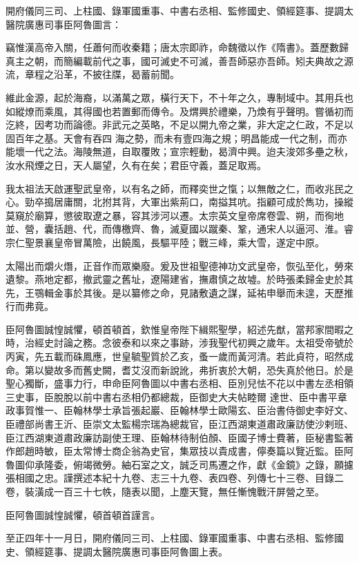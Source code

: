 
\begin{pinyinscope}

 開府儀同三司、上柱國、錄軍國重事、中書右丞相、監修國史、領經筵事、提調太醫院廣惠司事臣阿魯圖言：



 竊惟漢高帝入關，任蕭何而收秦籍；唐太宗即祚，命魏徵以作《隋書》。蓋歷數歸真主之朝，而簡編載前代之事，國可滅史不可滅，善吾師惡亦吾師。矧夫典故之源流，章程之沿革，不披往牒，曷蓄前聞。



 維此金源，起於海裔，以滿萬之眾，橫行天下，不十年之久，專制域中。其用兵也如縱燎而乘風，其得國也若置郵而傳令。及煟興於禮樂，乃煥有乎聲明。嘗循初而汔終，因考功而論德。非武元之英略，不足以開九帝之業，非大定之仁政，不足以固百年之基。天會有吞四
 海之勢，而未有壹四海之規；明昌能成一代之制，而亦能壞一代之法。海陵無道，自取覆敗；宣宗輕動，曷濟中興。迨夫浚郊多壘之秋，汝水飛煙之日，天人屬望，久有在矣；君臣守義，蓋足取焉。



 我太祖法天啟運聖武皇帝，以有名之師，而釋奕世之愾；以無敵之仁，而收兆民之心。勁卒搗居庸關，北拊其背，大軍出紫荊口，南搤其吭。指顧可成於雋功，操縱莫窺於廟算，懲彼取遼之暴，容其涉河以遷。太宗英文皇帝席卷雲、朔，而徇地並、營，囊括趙、代，而傳檄齊、魯，滅夏國以蹴秦、鞏，通宋人以逼河、淮。睿宗仁聖景襄皇帝冒萬險，出饒風，長驅平陸；戰三峰，乘大雪，遂定中原。



 太陽出而爝火熸，正音作而眾樂廢。爰及世祖聖德神功文武皇帝，恢弘至化，勞來遺黎。燕地定都，撤武靈之舊址，遼陽建省，撫肅慎之故墟。於時張柔歸金史於其先，王鶚輯金事於其後。是以纂修之命，見諸敷遺之謀，延祐申舉而未遑，天歷推行而弗竟。



 臣阿魯圖誠惶誠懼，頓首頓首，欽惟皇帝陛下緝熙聖學，紹述先猷，當邦家間暇之時，治經史討論之務。念彼泰和以來之事跡，涉我聖代初興之歲年。太祖受帝號於丙寅，先五載而硃鳳應，世皇毓聖質於乙亥，蚤一歲而黃河清。若此貞符，昭然成命。第以變故多而舊史闕，耆艾沒而新說訛，弗折衷於大朝，恐失真於他日。於是聖心獨斷，盛事力行，申命臣阿魯圖以中書右丞相、臣別兒怯不花以中書左丞相領三史事，臣脫脫以前中書右丞相仍都總裁，臣御史大夫帖睦爾
 達世、臣中書平章政事賀惟一、臣翰林學士承旨張起巖、臣翰林學士歐陽玄、臣治書侍御史李好文、臣禮部尚書王沂、臣崇文太監楊宗瑞為總裁官，臣江西湖東道肅政廉訪使沙剌班、臣江西湖東道肅政廉訪副使王理、臣翰林待制伯顏、臣國子博士費著，臣秘書監著作郎趙時敏，臣太常博士商企翁為史官，集眾技以貴成書，儜奏篇以覽近監。臣阿魯圖仰承隆委，俯竭微勞。紬石室之文，誠乏司馬遷之作，獻《金鏡》之錄，願攄張相國之忠。謹撰述本紀十九卷、志三十九卷、表四卷、列傳七十三卷、目錄二卷，裝潢成一百三十七帙，隨表以聞，上塵天覽，無任慚愧戰汗屏營之至。



 臣阿魯圖誠惶誠懼，頓首頓首謹言。



 至正四年十一月日，開府儀同三司、上柱國、錄軍國重事、中書右丞相、監修國史、領經筵事、提調太醫院廣惠司事臣阿魯圖上表。



\end{pinyinscope}